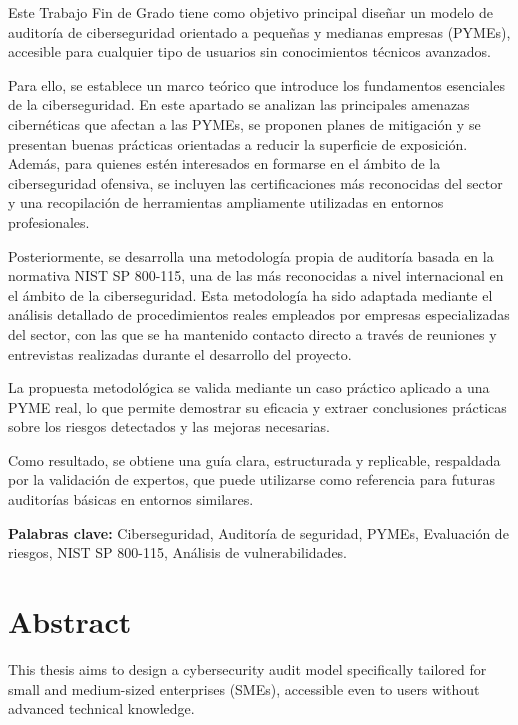 \documentclass[a4paper, 11pt]{article}
\begin{document}
Este Trabajo Fin de Grado tiene como objetivo principal diseñar un modelo de auditoría de ciberseguridad orientado a pequeñas y medianas empresas (PYMEs), accesible para cualquier tipo de usuarios sin conocimientos técnicos avanzados.

Para ello, se establece un marco teórico que introduce los fundamentos esenciales de la ciberseguridad. En este apartado se analizan las principales amenazas cibernéticas que afectan a las PYMEs, se proponen planes de mitigación y se presentan buenas prácticas orientadas a reducir la superficie de exposición. Además, para quienes estén interesados en formarse en el ámbito de la ciberseguridad ofensiva, se incluyen las certificaciones más reconocidas del sector y una recopilación de herramientas ampliamente utilizadas en entornos profesionales.

Posteriormente, se desarrolla una metodología propia de auditoría basada en la normativa NIST SP 800-115, una de las más reconocidas a nivel internacional en el ámbito de la ciberseguridad. Esta metodología ha sido adaptada mediante el análisis detallado de procedimientos reales empleados por empresas especializadas del sector, con las que se ha mantenido contacto directo a través de reuniones y entrevistas realizadas durante el desarrollo del proyecto.

La propuesta metodológica se valida mediante un caso práctico aplicado a una PYME real, lo que permite demostrar su eficacia y extraer conclusiones prácticas sobre los riesgos detectados y las mejoras necesarias.

Como resultado, se obtiene una guía clara, estructurada y replicable, respaldada por la validación de expertos, que puede utilizarse como referencia para futuras auditorías básicas en entornos similares.

\textbf{Palabras clave:} Ciberseguridad, Auditoría de seguridad, PYMEs, Evaluación de riesgos, NIST SP 800-115, Análisis de vulnerabilidades.
\clearpage

\thispagestyle{nohead}

\section*{Abstract}
This thesis aims to design a cybersecurity audit model specifically tailored for small and medium-sized enterprises (SMEs), accessible even to users without advanced technical knowledge.
\end{document}
